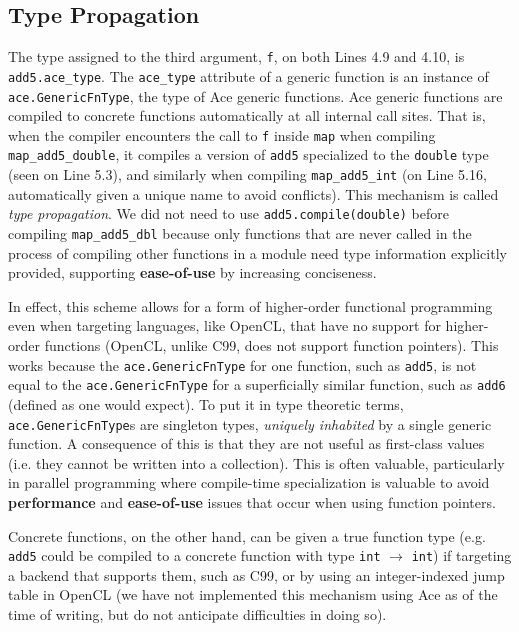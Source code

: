 \documentclass{sig-alternate}
\begin{document}
\subsection{Type Propagation}
The type assigned to the third argument, \verb|f|, on both Lines 4.9 and 4.10, is \verb|add5.ace_type|. The \verb|ace_type| attribute of a generic function is an instance of \verb|ace.GenericFnType|, the type of Ace generic functions. Ace generic functions are compiled to concrete functions automatically at all internal call sites. That is, when the compiler encounters the call to \verb|f| inside \verb|map| when compiling \verb|map_add5_double|, it compiles a version of \verb|add5| specialized to the \verb|double| type (seen on Line 5.3), and similarly when compiling \verb|map_add5_int| (on Line 5.16, automatically given a unique name to avoid conflicts). This mechanism is called {\em type propagation}. We did not need to use \verb|add5.compile(double)| before compiling \verb|map_add5_dbl| because only functions that are never called in the process of compiling other functions in a module need type information explicitly provided, supporting \textbf{ease-of-use} by increasing conciseness.

In effect, this scheme allows for a form of higher-order functional programming even when targeting languages, like OpenCL, that have no support for higher-order functions (OpenCL, unlike C99, does not support function pointers). This works because the \verb|ace.GenericFnType| for one function, such as \verb|add5|, is not equal to  the \verb|ace.GenericFnType| for a superficially similar function, such as \verb|add6| (defined as one would expect). To put it in type theoretic terms, \verb|ace.GenericFnType|s are singleton types, {\em uniquely inhabited} by a single generic function. A consequence of this is that they are not useful as first-class values (i.e. they cannot be written into a collection). This is often valuable, particularly in parallel programming where compile-time specialization is valuable to avoid \textbf{performance} and \textbf{ease-of-use} issues that occur when using function pointers.

Concrete functions, on the other hand, can be given a true function type (e.g. \verb|add5| could be compiled to a concrete function with type \verb|int| $\rightarrow$ \verb|int|) if targeting a backend that supports them, such as C99, or by using an integer-indexed jump table in OpenCL (we have not implemented this mechanism using Ace as of the time of writing, but do not anticipate difficulties in doing so).
\end{document}
